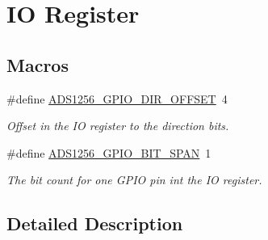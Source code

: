 \hypertarget{group__io__register}{\section{I\-O Register}
\label{group__io__register}
}
\subsection*{Macros}
\begin{DoxyCompactItemize}
\item 
\hypertarget{group__io__register_ga79e29004c3a9381caf716a834ad58426}{\#define \hyperlink{group__io__register_ga79e29004c3a9381caf716a834ad58426}{A\-D\-S1256\-\_\-\-G\-P\-I\-O\-\_\-\-D\-I\-R\-\_\-\-O\-F\-F\-S\-E\-T}~4}\label{group__io__register_ga79e29004c3a9381caf716a834ad58426}

\begin{DoxyCompactList}\small\item\em Offset in the I\-O register to the direction bits. \end{DoxyCompactList}\item 
\hypertarget{group__io__register_gaae5e18a5051bc2b7c8f7ff4237edae2a}{\#define \hyperlink{group__io__register_gaae5e18a5051bc2b7c8f7ff4237edae2a}{A\-D\-S1256\-\_\-\-G\-P\-I\-O\-\_\-\-B\-I\-T\-\_\-\-S\-P\-A\-N}~1}\label{group__io__register_gaae5e18a5051bc2b7c8f7ff4237edae2a}

\begin{DoxyCompactList}\small\item\em The bit count for one G\-P\-I\-O pin int the I\-O register. \end{DoxyCompactList}\end{DoxyCompactItemize}


\subsection{Detailed Description}
